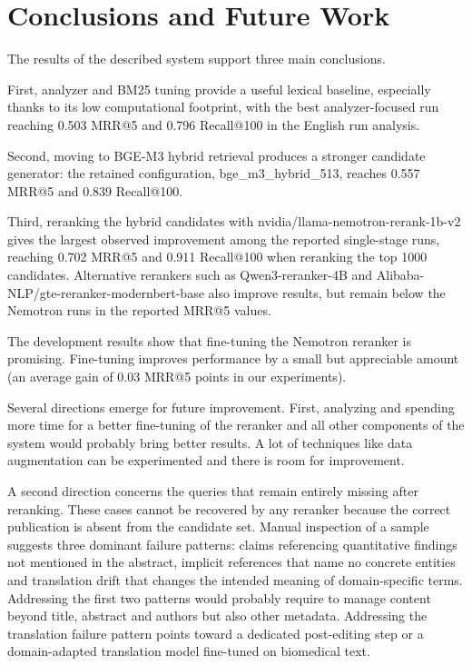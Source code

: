 \section{Conclusions and Future Work}
\label{sec:conclusion}

The results of the described system support three main conclusions.

First, analyzer and BM25 tuning provide a useful lexical baseline, especially thanks to its low computational footprint, with the best analyzer-focused run reaching 0.503 MRR@5 and 0.796 Recall@100 in the English run analysis.

Second, moving to BGE-M3 hybrid retrieval produces a stronger candidate generator: the retained configuration, bge\_m3\_hybrid\_513, reaches 0.557 MRR@5 and 0.839 Recall@100.

Third, reranking the hybrid candidates with nvidia/llama-nemotron-rerank-1b-v2 gives the largest observed improvement among the reported single-stage runs, reaching 0.702 MRR@5 and 0.911 Recall@100 when reranking the top 1000 candidates. Alternative rerankers such as Qwen3-reranker-4B and Alibaba-NLP/gte-reranker-modernbert-base also improve results, but remain below the Nemotron runs in the reported MRR@5 values.

The development results show that fine-tuning the Nemotron reranker is promising. Fine-tuning improves performance by a small but appreciable amount (an average gain of 0.03 MRR@5 points in our experiments).


Several directions emerge for future improvement. 
First, analyzing and spending more time for a better fine-tuning of the reranker and all other components of the system would probably bring better results. A lot of techniques like data augmentation can be experimented and there is room for improvement.

A second direction concerns the queries that remain entirely missing after reranking. These cases cannot be recovered by any reranker because the correct publication is absent from the candidate set. Manual inspection of a sample suggests three dominant failure patterns: claims referencing quantitative findings not mentioned in the abstract, implicit references that name no concrete entities and translation drift that changes the intended meaning of domain-specific terms. Addressing the first two patterns would probably require to manage content beyond title, abstract and authors but also other metadata. Addressing the translation failure pattern points toward a dedicated post-editing step or a domain-adapted translation model fine-tuned on biomedical text.


